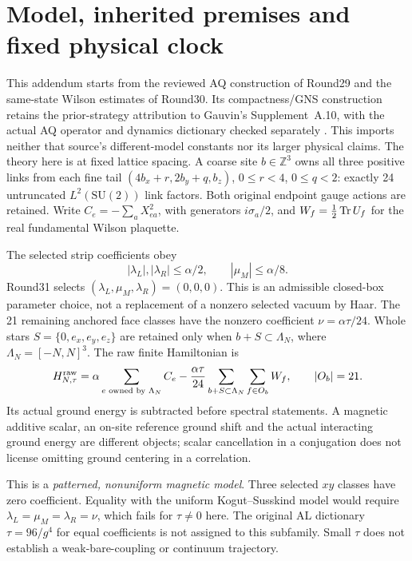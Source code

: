 \section{Model, inherited premises and fixed physical clock}

This addendum starts from the reviewed AQ construction of Round29 and the
same-state Wilson estimates of Round30. Its compactness/GNS construction
retains the prior-strategy attribution to Gauvin's Supplement~A.10, with the
actual AQ operator and dynamics dictionary checked separately
\cite{gauvin,ns,aq}. This imports neither that source's different-model
constants nor its larger physical claims. The theory here is at fixed lattice
spacing. A coarse site $b\in\mathbb Z^3$ owns all three positive links from each
fine tail $(4b_x+r,2b_y+q,b_z)$, $0\le r<4$, $0\le q<2$: exactly 24 untruncated
$L^2(\mathrm{SU}(2))$ link factors. Both original endpoint gauge actions are
retained. Write $C_e=-\sum_a X_{ea}^2$, with generators $i\sigma_a/2$, and
$W_f=\tfrac12\operatorname{Tr} U_f$ for the real fundamental Wilson plaquette.

The selected strip coefficients obey
\begin{equation}
 |\lambda_L|,|\lambda_R|\le\alpha/2,\qquad |\mu_M|\le\alpha/8.
 \label{eq:selected}
\end{equation}
Round31 selects $(\lambda_L,\mu_M,\lambda_R)=(0,0,0)$. This is an admissible
closed-box parameter choice, not a replacement of a nonzero selected vacuum by
Haar. The 21 remaining anchored face classes have the nonzero coefficient
$\nu=\alpha\tau/24$. Whole stars
$S=\{0,e_x,e_y,e_z\}$ are retained only when $b+S\subset\Lambda_N$, where
$\Lambda_N=[-N,N]^3$. The raw finite Hamiltonian is
\begin{equation}
 H_{N,\tau}^{\rm raw}
 =\alpha\sum_{e\text{ owned by }\Lambda_N}C_e
 -\frac{\alpha\tau}{24}
   \sum_{b+S\subset\Lambda_N}\sum_{f\in O_b}W_f,
 \qquad |O_b|=21.
 \label{eq:model}
\end{equation}
Its actual ground energy is subtracted before spectral statements. A magnetic
additive scalar, an on-site reference ground shift and the actual interacting
ground energy are different objects; scalar cancellation in a conjugation does
not license omitting ground centering in a correlation.

This is a \emph{patterned, nonuniform magnetic model}. Three selected $xy$ classes
have zero coefficient. Equality with the uniform Kogut--Susskind model would
require $\lambda_L=\mu_M=\lambda_R=\nu$, which fails for $\tau\ne0$ here. The
original AL dictionary $\tau=96/g^4$ for equal coefficients is not assigned to
this subfamily. Small $\tau$ does not establish a weak-bare-coupling or continuum
trajectory.

